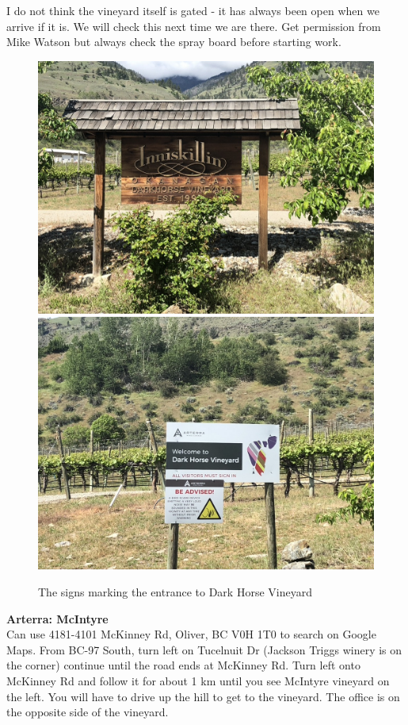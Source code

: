 \documentclass[11pt,letter]{article}
\begin{document}
I do not think the vineyard itself is gated - it has always been open when we arrive if it is. We will check this next time we are there. Get permission from Mike Watson but always check the spray board before starting work. \\

\begin{figure} [h]
  \includegraphics[scale = .25]{darkhorseSign1.jpeg}
   \includegraphics[scale = .25]{darkhorseSign2.jpeg}
  \caption{The signs marking the entrance to Dark Horse Vineyard}
  \label{fig:DHsigns}
\end{figure}

{\bf Arterra: McIntyre} \\
Can use 4181-4101 McKinney Rd, Oliver, BC V0H 1T0 to search on Google Maps.
From BC-97 South, turn left on Tucelnuit Dr (Jackson Triggs winery is on the corner) continue until the road ends at McKinney Rd. Turn left onto McKinney Rd and follow it for about 1 km until you see McIntyre vineyard on the left. You will have to drive up the hill to get to the vineyard. The office is on the opposite side of the vineyard.
\end{document}
